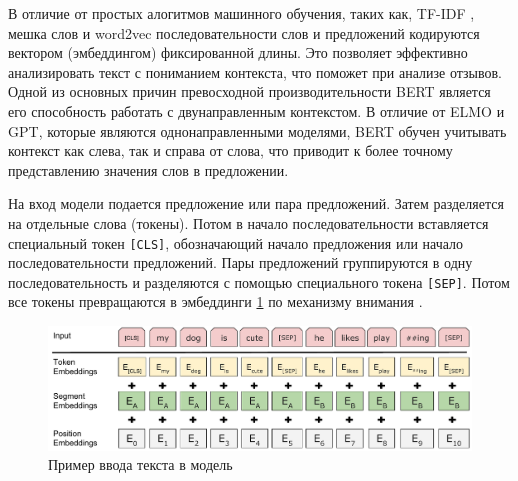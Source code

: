 \documentclass[PI, VKR]{HSEUniversity}
\begin{document}
В отличие от простых алогитмов машинного обучения, таких как, TF-IDF \autocite{jones1972statistical}, мешка слов\autocite{doi:10.1080/00437956.1954.11659520} и word2vec \autocite{mikolov2013efficient} последовательности слов и предложений кодируются вектором (эмбеддингом) фиксированной длины. Это позволяет эффективно анализировать текст с пониманием контекста, что поможет при анализе отзывов.
Одной из основных причин превосходной производительности BERT является его способность работать с двунаправленным контекстом. В отличие от ELMO \autocite{elmo} и GPT\autocite{radford2019language}, которые являются однонаправленными моделями, BERT обучен учитывать контекст как слева, так и справа от слова, что приводит к более точному представлению значения слов в предложении.

На вход модели подается предложение или пара предложений. Затем разделяется на отдельные слова (токены).  Потом в начало последовательности вставляется специальный токен \texttt{[CLS]}, обозначающий начало предложения или начало последовательности предложений. Пары предложений группируются в одну последовательность и разделяются с помощью специального токена \texttt{[SEP]}. Потом все токены превращаются в эмбеддинги \ref{fig:inputemebeddings} по механизму внимания \autocite{NIPS2017_3f5ee243}.

\begin{figure}[h]
\centering
\includegraphics[width=.9\linewidth]{img/Input_Emebeddings.pdf}
\caption{\label{fig:inputemebeddings}Пример ввода текста в модель}
\end{figure}
\end{document}

